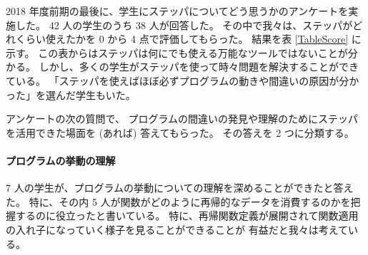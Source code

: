 2018 年度前期の最後に、学生にステッパについてどう思うかのアンケートを実施した。
42 人の学生のうち 38 人が回答した。
その中で我々は、ステッパがどれくらい使えたかを 0 から 4 点で評価してもらった。
結果を表 \ref{TableScore} に示す。
この表からはステッパは何にでも使える万能なツールではないことが分かる。
しかし、多くの学生がステッパを使って時々問題を解決することができている。
「ステッパを使えばほぼ必ずプログラムの動きや間違いの原因が分かった」を選んだ学生もいた。

アンケートの次の質問で、
プログラムの間違いの発見や理解のためにステッパを活用できた場面を (あれば) 答えてもらった。
その答えを 2 つに分類する。

\paragraph{プログラムの挙動の理解}
7 人の学生が、プログラムの挙動についての理解を深めることができたと答えた。
特に、その内 5 人が関数がどのように再帰的なデータを消費するのかを把握するのに役立ったと書いている。
特に、再帰関数定義が展開されて関数適用の入れ子になっていく様子を見ることができることが
有益だと我々は考えている。

